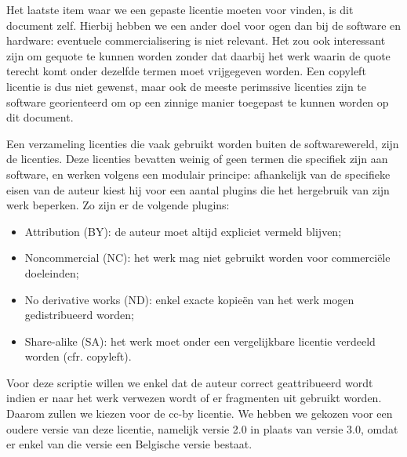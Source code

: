 Het laatste item waar we een gepaste licentie moeten voor vinden, is dit document zelf. Hierbij hebben we een ander doel voor ogen dan bij de software en hardware: eventuele commercialisering is niet relevant. Het zou ook interessant zijn om gequote te kunnen worden zonder dat daarbij het werk waarin de quote terecht komt onder dezelfde termen moet vrijgegeven worden. Een copyleft licentie is dus niet gewenst, maar ook de meeste perimssive licenties zijn te software georienteerd om op een zinnige manier toegepast te kunnen worden op dit document.

Een verzameling licenties die vaak gebruikt worden buiten de softwarewereld, zijn de  licenties. Deze licenties bevatten weinig of geen termen die specifiek zijn aan software, en werken volgens een modulair principe: afhankelijk van de specifieke eisen van de auteur kiest hij voor een aantal plugins die het hergebruik van zijn werk beperken. Zo zijn er de volgende plugins:
\begin{itemize}
  \item Attribution (BY): de auteur moet altijd expliciet vermeld blijven;
  \item Noncommercial (NC): het werk mag niet gebruikt worden voor commerciële doeleinden;
  \item No derivative works (ND): enkel exacte kopieën van het werk mogen gedistribueerd worden;
  \item Share-alike (SA): het werk moet onder een vergelijkbare licentie verdeeld worden (cfr. copyleft).
\end{itemize}

Voor deze scriptie willen we enkel dat de auteur correct geattribueerd wordt indien er naar het werk verwezen wordt of er fragmenten uit gebruikt worden. Daarom zullen we kiezen voor de \ac{cc-by} licentie. We hebben we gekozen voor een oudere versie van deze licentie, namelijk versie 2.0 in plaats van versie 3.0, omdat er enkel van die versie een Belgische versie bestaat.
